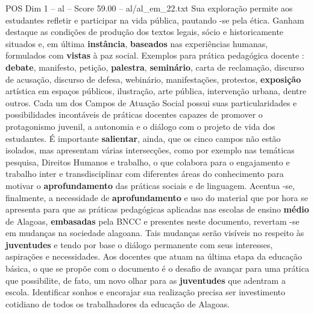 \begin{textsample}{POS Dim 1 – al – Score 59.00 – al/al\_em\_22.txt}
Sua exploração permite aos estudantes refletir e participar na vida pública, pautando -se pela ética.
Ganham destaque as condições de produção dos textos legais, sócio e historicamente situados e, em última \textbf{instância}, \textbf{baseados} nas experiências humanas, formulados com \textbf{vistas} à paz social.
Exemplos para prática pedagógica docente : \textbf{debate}, manifesto, petição, \textbf{palestra}, \textbf{seminário}, carta de reclamação, discurso de acusação, discurso de defesa, webinário, manifestações, protestos, \textbf{exposição} artística em espaços públicos, ilustração, arte pública, intervenção urbana, dentre outros.
Cada um dos Campos de Atuação Social possui suas particularidades e possibilidades incontáveis de práticas docentes capazes de promover o protagonismo juvenil, a autonomia e o diálogo com o projeto de vida dos estudantes.
É importante \textbf{salientar}, ainda, que os cinco campos não estão isolados, mas apresentam várias intersecções, como por exemplo nas temáticas pesquisa, Direitos Humanos e trabalho, o que colabora para o engajamento e trabalho inter e transdisciplinar com diferentes áreas do conhecimento para motivar o \textbf{aprofundamento} das práticas sociais e de linguagem.
Acentua -se, finalmente, a necessidade de \textbf{aprofundamento} e uso do material que por hora se apresenta para que as práticas pedagógicas aplicadas nas escolas de ensino \textbf{médio} de Alagoas, \textbf{embasadas} pela BNCC e presentes neste documento, revertam -se em mudanças na sociedade alagoana.
Tais mudanças serão visíveis no respeito às \textbf{juventudes} e tendo por base o diálogo permanente com seus interesses, aspirações e necessidades.
Aos docentes que atuam na última etapa da educação básica, o que se propõe com o documento é o desafio de avançar para uma prática que possibilite, de fato, um novo olhar para as \textbf{juventudes} que adentram a escola.
Identificar sonhos e encorajar sua realização precisa ser investimento cotidiano de todos os trabalhadores da educação de Alagoas.

\end{textsample}
